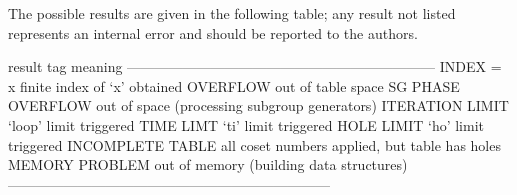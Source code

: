 

The possible results are given in the following table; any result  not
listed represents an internal error and  should  be  reported  to  the
{\ACE} authors.

\begintt
result tag           meaning 
------------------------------------------------------------------
INDEX = x            finite index of `x' obtained
OVERFLOW             out of table space
SG PHASE OVERFLOW    out of space (processing subgroup generators)
ITERATION LIMIT      `loop' limit triggered
TIME LIMT            `ti' limit triggered
HOLE LIMIT           `ho' limit triggered
INCOMPLETE TABLE     all coset numbers applied, but table has holes
MEMORY PROBLEM       out of memory (building data structures)
---------------------------------------------------------------------
\endtt

